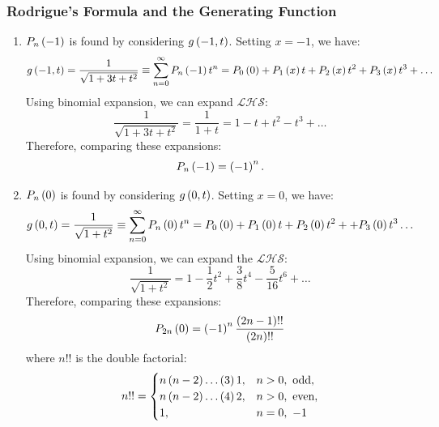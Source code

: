 \subsubsection{Rodrigue's Formula and the Generating Function}
\begin{enumerate}
    \item $P_n\left(-1\right)$ is found by considering $g\left(-1,t\right)$. Setting $x=-1$, we have:
    \begin{equation*}
        g\left(-1,t\right)=\frac{1}{\sqrt{1+3t+t^2}}\equiv \sum_{n=0}^{\infty}P_n\left(-1\right)t^n=P_0\left(0\right)+P_1\left(x\right)t+P_2\left(x\right)t^2+P_3\left(x\right)t^3+\ldots
    \end{equation*}
    Using binomial expansion, we can expand $\mathcal{LHS}$:
    \begin{equation*}
        \frac{1}{\sqrt{1+3t+t^2}}=\frac{1}{1+t}=1-t+t^2-t^3+\ldots
    \end{equation*}
    Therefore, comparing these expansions:
    \begin{equation*}
        P_n\left(-1\right)=\left(-1\right)^n.
    \end{equation*}
    \item $P_n\left(0\right)$ is found by considering $g\left(0,t\right)$. Setting $x=0$, we have:
    \begin{equation*}
        g\left(0,t\right)=\frac{1}{\sqrt{1+t^2}}\equiv\sum_{n=0}^{\infty}P_n\left(0\right)t^n=P_0\left(0\right)+P_1\left(0\right)t+P_2\left(0\right)t^2++P_3\left(0\right)t^3\ldots
    \end{equation*}
    Using binomial expansion, we can expand the $\mathcal{LHS}$:
    \begin{equation*}
        \frac{1}{\sqrt{1+t^2}}=1-\frac{1}{2}t^2+\frac{3}{8}t^4-\frac{5}{16}t^6+\ldots
    \end{equation*}
    Therefore, comparing these expansions:
    \begin{equation*}
        P_{2n}\left(0\right)=\left(-1\right)^n\frac{\left(2n-1\right)!!}{\left(2n\right)!!}
    \end{equation*}
    where $n!!$ is the double factorial:
    \begin{equation*}
        n!!=\begin{cases}
            n\bracket{n-2}\ldots\bracket{3}1,& n>0,\ \text{odd},\\
            n\bracket{n-2}\ldots\bracket{4}2,& n>0,\ \text{even},\\
            1,& n=0,\ -1
        \end{cases}
    \end{equation*}
\end{enumerate}
\newpage
